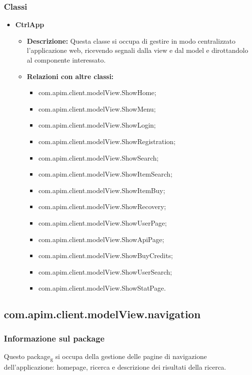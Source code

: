 {{{			\subsubsection{Classi}
			\begin{itemize}
				\item \textbf{CtrlApp}
				\begin{itemize}
					\item \textbf{Descrizione:} Questa classe si occupa di gestire in modo centralizzato l'applicazione web, ricevendo segnali dalla view e dal model e dirottandolo al componente interessato.
					\item \textbf{Relazioni con altre classi:}
					\begin{itemize}
						\item com.apim.client.modelView.ShowHome;
						\item com.apim.client.modelView.ShowMenu;
						\item com.apim.client.modelView.ShowLogin;
						\item com.apim.client.modelView.ShowRegistration;
						\item com.apim.client.modelView.ShowSearch;
						\item com.apim.client.modelView.ShowItemSearch;
						\item com.apim.client.modelView.ShowItemBuy;
						\item com.apim.client.modelView.ShowRecovery;
						\item com.apim.client.modelView.ShowUserPage;
						\item com.apim.client.modelView.ShowApiPage;
						\item com.apim.client.modelView.ShowBuyCredits;
						\item com.apim.client.modelView.ShowUserSearch;
						\item com.apim.client.modelView.ShowStatPage.
					\end{itemize}
				\end{itemize}
			\end{itemize}
		}
	}
	\subsection{com.apim.client.modelView.navigation}{
		\subsubsection{Informazione sul package}{
			Questo package\textsubscript{g} si occupa della gestione delle pagine di navigazione dell'applicazione: homepage, ricerca e descrizione dei risultati della ricerca.
		}
}}
